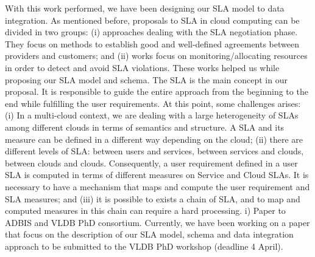 \documentclass[11pt,a4paper,oneside]{report}
\begin{document}

With this work performed, we have been designing our SLA model to data integration. As mentioned before, proposals to SLA in cloud computing can be divided in two groups: (i) approaches dealing with the SLA negotiation phase. They focus on methods to establish good and well-defined agreements between providers and customers; and (ii) works focus on monitoring/allocating resources in order to detect and avoid SLA violations. These works helped us while proposing our SLA model and schema. The SLA is the main concept in our proposal. It is responsible to guide the entire approach from the beginning to the end while fulfilling the user requirements. At this point, some challenges arises: (i) In a multi-cloud context, we are dealing with a large heterogeneity of SLAs among different clouds in terms of semantics and structure. A SLA and its measure can be defined in a different way depending on the cloud; (ii) there are different levels of SLA: between users and services, between services and clouds, between clouds and clouds. Consequently, a user requirement defined in a user SLA is computed in terms of different measures on Service and Cloud SLAs. It is necessary to have a mechanism that maps and compute the user requirement and SLA measures; and (iii) it is possible to exists a chain of SLA, and to map and computed measures in this chain can require a hard processing. i) Paper to ADBIS and VLDB PhD consortium. Currently, we have been working on a paper that focus on the description of our SLA model, schema and data integration approach to be submitted to the VLDB PhD workshop (deadline 4 April).
\end{document}
